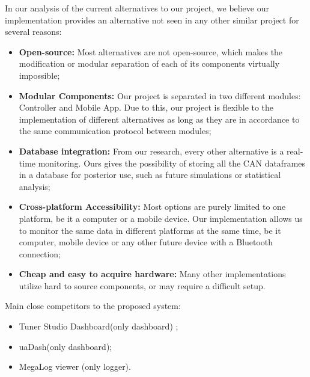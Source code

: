 In our analysis of the current alternatives to our project, we believe our implementation provides an alternative not seen in any other similar project for several reasons:

\begin{itemize}
    \item \textbf{Open-source:} Most alternatives are not open-source, which makes the modification or modular separation of each of its components virtually impossible;
    \item \textbf{Modular Components:} Our project is separated in two different modules: Controller and Mobile App. Due to this, our project is flexible to the implementation of different alternatives as long as they are in accordance to the same communication protocol between modules;
    \item \textbf{Database integration:} From our research, every other alternative is a real-time monitoring. Ours gives the possibility of storing all the CAN dataframes in a database for posterior use, such as future simulations or statistical analysis;
    \item \textbf{Cross-platform Accessibility:} Most options are purely limited to one platform, be it a computer or a mobile device. Our implementation allows us to monitor the same data in different platforms at the same time, be it computer, mobile device or any other future device with a Bluetooth connection;
    \item\textbf{Cheap and easy to acquire hardware:} Many other implementations utilize hard to source components, or may require a difficult setup.
\end{itemize}

Main close competitors to the proposed system:
 
\begin{itemize}
    \item Tuner Studio Dashboard(only dashboard) \cite{ts};
	\item uaDash(only dashboard)\cite{uadash};
	\item MegaLog viewer (only logger)\cite{mlviewer}.
\end{itemize}
